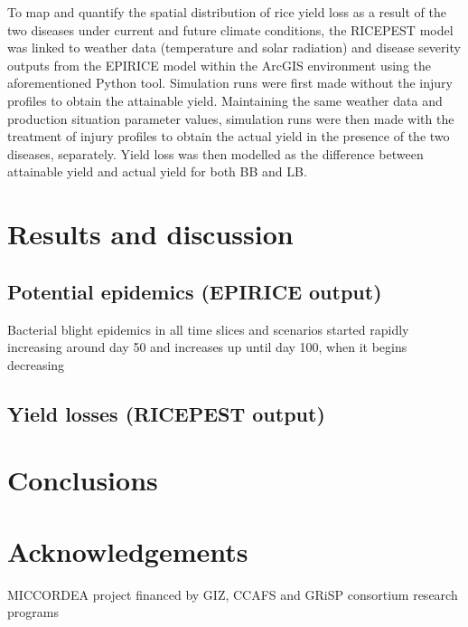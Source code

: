 \documentclass[preprint,12pt]{elsarticle}
\begin{document}
To map and quantify the spatial distribution of rice yield loss as a result of the two diseases under current and future climate conditions, the RICEPEST model was linked to weather data (temperature and solar radiation) and disease severity outputs from the EPIRICE model within the ArcGIS environment using the aforementioned Python tool. Simulation runs were first made without the injury profiles to obtain the attainable yield. Maintaining the same weather data and production situation parameter values, simulation runs were then made with the treatment of injury profiles to obtain the actual yield in the presence of the two diseases, separately. Yield loss was then modelled as the difference between attainable yield and actual yield for both BB and LB.

\section{Results and discussion}

\subsection{Potential epidemics (EPIRICE output)}
Bacterial blight epidemics in all time slices and scenarios started rapidly increasing around day 50 and increases up until day 100, when it begins decreasing 

\subsection{Yield losses (RICEPEST output)}

\section{Conclusions}

\section{Acknowledgements}
MICCORDEA project financed by GIZ, CCAFS and GRiSP consortium research programs


\appendix
\end{document}
